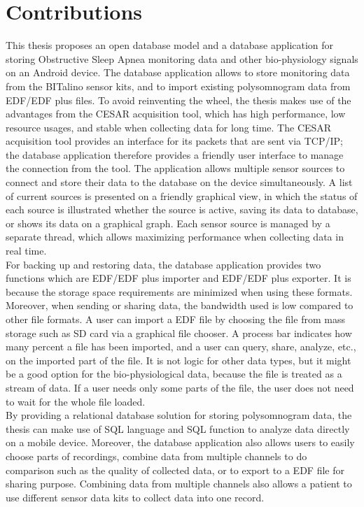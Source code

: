 \section{Contributions}
This thesis proposes an open database model and a database application for storing Obstructive Sleep Apnea monitoring data and other bio-physiology signals on an Android device. The database application allows to store monitoring data from the BITalino sensor kits, and to import existing polysomnogram data from EDF/EDF plus files. To avoid reinventing the wheel, the thesis makes use of the advantages from the CESAR acquisition tool, which has high performance, low resource usages, and stable when collecting data for long time. The CESAR acquisition tool provides an interface for its packets that are sent via TCP/IP; the database application therefore provides a friendly user interface to manage the connection from the tool. The application allows multiple sensor sources to connect and store their data to the database on the device simultaneously. A list of current sources is presented on a friendly graphical view, in which the status of each source is illustrated whether the source is active, saving its data to database, or shows its data on a graphical graph. Each sensor source is managed by a separate thread, which allows maximizing performance when collecting data in real time.\\
For backing up and restoring data, the database application provides two functions which are EDF/EDF plus importer and EDF/EDF plus exporter. It is because the storage space requirements are minimized when using these formats. Moreover, when sending or sharing data, the bandwidth used is low compared to other file formats. A user can import a EDF file by choosing the file from mass storage such as SD card via a graphical file chooser. A process bar indicates how many percent a file has been imported, and a user can query, share, analyze, etc., on the imported part of the file. It is not logic for other data types, but it might be a good option for the bio-physiological data, because the file is treated as a stream of data. If a user needs only some parts of the file, the user does not need to wait for the whole file loaded.\\
By providing a relational database solution for storing polysomnogram data, the thesis can make use of SQL language and SQL function to analyze data directly on a mobile device. Moreover, the database application also allows users to easily choose parts of recordings, combine data from multiple channels to do comparison such as the quality of collected data, or to export to a EDF file for sharing purpose. Combining data from multiple channels also allows a patient to use different sensor data kits to collect data into one record.\\

